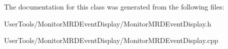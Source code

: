 The documentation for this class was generated from the following files\-:\begin{DoxyCompactItemize}
\item 
User\-Tools/\-Monitor\-M\-R\-D\-Event\-Display/Monitor\-M\-R\-D\-Event\-Display.\-h\item 
User\-Tools/\-Monitor\-M\-R\-D\-Event\-Display/Monitor\-M\-R\-D\-Event\-Display.\-cpp\end{DoxyCompactItemize}
